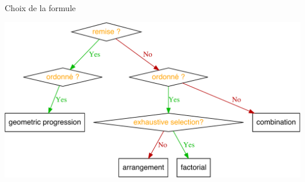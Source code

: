 \documentclass[ignorenonframetext,]{beamer}
\begin{document}
\begin{frame}{Choix de la formule}
\protect\hypertarget{choix-de-la-formule}{}

\begin{center}\includegraphics[width=0.9\linewidth]{figures/02_combinatorics_combinatorix_flowchart-1} \end{center}

\end{frame}
\end{document}
